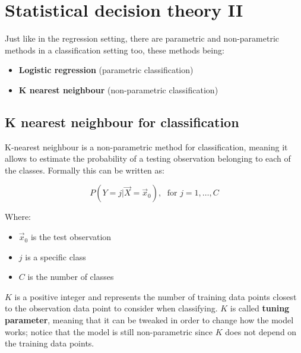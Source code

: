 \graphicspath{{chapters/images/0203/}}

\chapter{Statistical decision theory II}
  Just like in the regression setting, there are parametric and non-parametric
  methods in a classification setting too, these methods being:
  \begin{itemize}
    \item \textbf{Logistic regression} (parametric classification)
    \item \textbf{K nearest neighbour} (non-parametric classification)
  \end{itemize}

  \section{K nearest neighbour for classification}
    K-nearest neighbour is a non-parametric method for classification, meaning
    it allows to estimate the probability of a testing observation belonging to
    each of the classes. Formally this can be written as:

    $$P(Y = j | \vec{X} = \vec{x}_0), \; \text{ for } j = 1, \dots, C$$ 

    Where:
    \begin{itemize}
      \item $\vec{x}_0$ is the test observation
      \item $j$ is a specific class
      \item $C$ is the number of classes
    \end{itemize}
    
    \textbf{$K$} is a positive integer and represents the number of training
    data points closest to the observation data point to consider when
    classifying. $K$ is called \textbf{tuning parameter}, meaning that it can be
    tweaked in order to change how the model works; notice that the model is
    still non-parametric since $K$ does not depend on the training data points.


